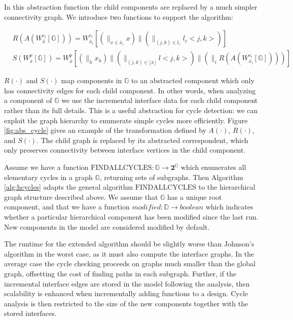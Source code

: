In this abstraction function the child components are replaced by a much simpler
connectivity graph.  We introduce two functions to support the algorithm:

\begin{align}
&R(A(W_{\bar{x}}^{c_i} [\mathbb{G}])) = W_{\bar{x}_i}^{c_i} [ (\parallel_{x \in \bar{x}_i} x) \parallel (\parallel_{(j,k) \in l_c} l_c<j,k> ) ] \\
&S(W_{\bar{x}}^p [\mathbb{G}]) = W_{\bar{x}}^p [ (\parallel_h x_h) \parallel
(\parallel_{(j,k) \in \lfloor \bar{x} \rfloor} l<j,k>) \parallel
(\parallel_{i} R(A(W_{\bar{x}_i}^{c_i} [\mathbb{G}]))) ] 
\end{align}

$R(\cdot)$ and $S(\cdot)$ map components in $\mathbb{G}$ to 
an abstracted component which only has connectivity edges 
for each child component.  In other words, when analyzing a component
of $\mathbb{G}$ we use the incremental interface data for each child
component rather than its full details. This is a useful abstraction for 
cycle detection: we can exploit the graph hierarchy to 
enumerate simple cycles more efficiently.  Figure \ref{fig:abs_cycle} gives an example of the transformation defined by $A(\cdot)$, $R(\cdot)$, and $S(\cdot)$.  The child graph is replaced by its abstracted correspondent, which only preserves connectivity between interface vertices in the child component.

Assume we have a function 
${\scriptstyle \mathrm{FINDALLCYCLES}}: \mathbb{G} \rightarrow \mathbf{2}^{\mathbb{G}}$
which enumerates all elementary cycles in a graph $\mathbb{G}$, 
returning sets of subgraphs.  Then Algorithm \ref{alg:hcycles} 
adapts the general algorithm
${\scriptstyle \mathrm{FINDALLCYCLES}}$ to the hierarchical graph 
structure described above.  We 
assume that $\mathbb{G}$ has a unique root component, and that we have a 
function $modified: \mathbb{D} \rightarrow boolean$ which indicates whether
a particular hierarchical component has been modified since the last run.
New components in the model are considered modified by default.

The runtime for the extended algorithm should be slightly worse than Johnson's 
algorithm in the worst case, as it must also compute the interface graphs.  
In the average case the cycle checking proceeds on graphs much smaller than
the global graph, offsetting the cost of finding paths in each subgraph.
Further, if the incremental interface edges are stored in the model following
the analysis, then scalability is enhanced when incrementally adding functions to a design.  Cycle analysis is then restricted to the size of the new components together with the stored interfaces.

